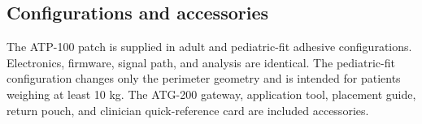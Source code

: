 \subsection{Configurations and accessories}
The ATP-100 patch is supplied in adult and pediatric-fit adhesive configurations. Electronics, firmware, signal path, and analysis are identical. The pediatric-fit configuration changes only the perimeter geometry and is intended for patients weighing at least 10 kg. The ATG-200 gateway, application tool, placement guide, return pouch, and clinician quick-reference card are included accessories.

